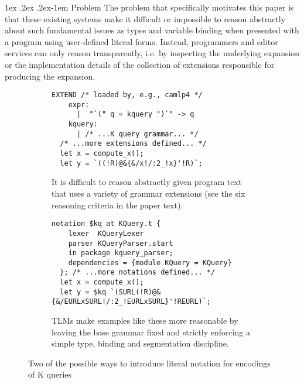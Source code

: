 \documentclass[acmsmall,screen]{acmart}
\makeatletter
\renewcommand{\paragraph}{%
  \@startsection{paragraph}{4}%
  {\z@}{1ex \@plus .2ex \@minus .2ex}{-1em}%
  {\normalfont\normalsize\bfseries}%
}
\makeatother
\begin{document}
\paragraph{Problem} The problem that specifically motivates this paper is that these existing systems  make it difficult or impossible to reason abstractly about such fundamental issues as types and variable binding when presented with a program using user-defined literal forms. Instead, programmers and editor services can only reason transparently, i.e. by inspecting the underlying expansion or the implementation details of the collection of extensions responsible for producing the expansion.%
\begin{figure}[t!]
\vspace{4px}
\begin{subfigure}[t]{0.46\textwidth}
\begin{lstlisting}[xleftmargin=-2pt, morekeywords={EXTEND}]
  EXTEND /* loaded by, e.g., camlp4 */
    expr:
      |  "`(" q = kquery ")`" -> q
    kquery: 
      | /* ...K query grammar... */
  /* ...more extensions defined... */
  let x = compute_x();
  let y = `((!R)@&{&/x!/:2_!x}'!R)`;
\end{lstlisting}
\vspace{-5px}
\caption{It is difficult to reason abstractly given program text that uses a variety of grammar extensions (see the six reasoning criteria in the paper text).}
\label{fig:K-dialect}
\end{subfigure}
\hfill
\begin{subfigure}[t]{0.51\textwidth}
\begin{lstlisting}[xleftmargin=-2pt]
  notation $kq at KQuery.t {
    lexer  KQueryLexer
    parser KQueryParser.start
    in package kquery_parser;
    dependencies = {module KQuery = KQuery}
  }; /* ...more notations defined... */
  let x = compute_x();
  let y = $kq `(SURL(!R)@&{&/EURLxSURL!/:2_!EURLxSURL}'!REURL)`;
\end{lstlisting}
\vspace{-5px}
\caption{TLMs make examples like these more reasonable by leaving the base grammar fixed and strictly enforcing a simple type, binding and segmentation discipline.}
\label{fig:K-tsm-example}
\end{subfigure}
\vspace{2px}
\caption{Two of the possible ways to introduce literal notation for encodings of K queries}
\vspace{-4px}
\end{figure}
\end{document}
